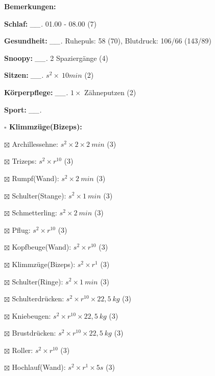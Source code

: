 \documentclass[10pt,a4paper]{article}
\newcommand\prop[1] {{\color {alizarin} {\bf #1}}}             %
\newcommand\mand[1] {{\color {burntorange} {\bf #1}}}          %
\newcommand\topspace{\vskip -15pt \hskip 20pt}
\newcommand\n[1] { {\sl #1.} \hskip 5pt }
\begin{document}
\begin{mdframed}[style=daystyle]
  \begin{labeling}{{\mand {Bemerkungen:}}}
    \setlength\itemsep{-3pt}
  \item[{\mand {Schlaf:}}]        \n{\_\_} 01.00 - 08.00 (7)
  \item[{\mand {Gesundheit:}}]    \n{\_\_} Ruhepuls: 58 (70), Blutdruck: 106/66 (143/89)
  \item[{\mand {Snoopy:}}]        \n{\_\_} 2 Spaziergänge (4)
  \item[{\mand {Sitzen:}}]        \n{\_\_} $s^2 \times\ 10 min$ (2)
  \item[{\mand {Körperpflege:}}]  \n{\_\_} $1 \times$ Zähneputzen (2)
  \item[{\mand {Sport:}}]         \n{\_\_}
    \topspace
    \begin{minipage}{0.75\textwidth}  
      \begin{labeling}{\prop {$\square$ {Klimmzüge(Bizeps):}}}
        \setlength\itemsep{-3pt}
      \item[$\boxtimes$ Archillessehne:]    $s^2 \times 2 \times 2\ min$ (3)
      \item[$\boxtimes$ Trizeps:]           $s^2 \times r^{10}$ (3)
      \item[$\boxtimes$ Rumpf(Wand):]       $s^2 \times 2\ min$ (3)
      \item[$\boxtimes$ Schulter(Stange):]  $s^2 \times 1\ min$ (3)
      \item[$\boxtimes$ Schmetterling:]     $s^2 \times 2\ min$ (3)
      \item[$\boxtimes$ Pflug:]             $s^2 \times r^{10}$ (3)
      \item[$\boxtimes$ Kopfbeuge(Wand):]   $s^2 \times r^{10}$ (3)
      \item[$\boxtimes$ Klimmzüge(Bizeps):] $s^2 \times r^1$ (3)
      \item[$\boxtimes$ Schulter(Ringe):]   $s^2 \times 1\ min$ (3)
      \item[$\boxtimes$ Schulterdrücken:]   $s^2 \times r^{10} \times 22,5\ kg$ (3)
      \item[$\boxtimes$ Kniebeugen:]        $s^2 \times r^{10} \times 22,5\ kg$ (3)
      \item[$\boxtimes$ Brustdrücken:]      $s^2 \times r^{10} \times 22,5\ kg$ (3)
      \item[$\boxtimes$ Roller:]            $s^2 \times r^{10}$ (3)
      \item[$\boxtimes$ Hochlauf(Wand):]    $s^2 \times r^{1} \times 5s$ (3)

\end{labeling}
\end{minipage}
\end{labeling}
\end{mdframed}
\end{document}
